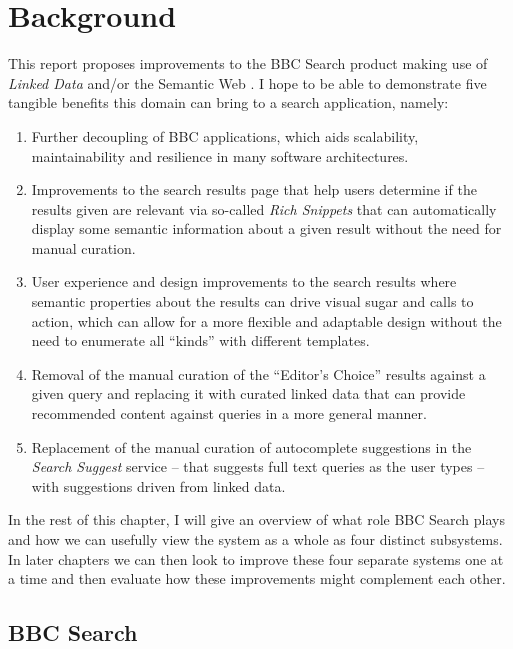 \documentclass[10pt,a4paper]{report}
\title{}
\author{Ross Fenning}
\begin{document}
\maketitle

\chapter{Background}

This report proposes improvements to the BBC Search product making use
of \emph{Linked Data} \cite{} and/or the Semantic Web \cite{}. I hope
to be able to demonstrate five tangible benefits this domain can
bring to a search application, namely:

\begin{enumerate}
  \item Further decoupling of BBC applications, which aids scalability,
    maintainability and resilience in many software architectures. \cite{}
  \item Improvements to the search results page that help users determine
    if the results given are relevant via so-called \emph{Rich Snippets}
    that can automatically display some semantic information about a given
    result without the need for manual curation.
  \item User experience and design improvements to the search results
    where semantic properties about the results can drive visual sugar
    and calls to action, which can allow for a more flexible and
    adaptable design without the need to enumerate all ``kinds'' with
    different templates.
  \item Removal of the manual curation of the ``Editor's Choice'' results
    against a given query and replacing it with curated linked data that
    can provide recommended content against queries in a more general
    manner.
  \item Replacement of the manual curation of autocomplete suggestions
    in the \emph{Search Suggest} service -- that suggests full text queries
    as the user types -- with suggestions driven from linked data.
\end{enumerate}

In the rest of this chapter, I will give an overview of what role BBC
Search plays and how we can usefully view the system as a whole as four
distinct subsystems. In later chapters we can then look to improve these
four separate systems one at a time and then evaluate how these improvements
might complement each other.

\section{BBC Search}
\end{document}
